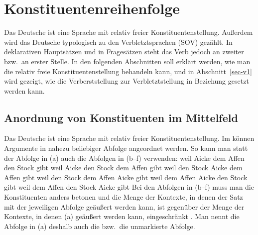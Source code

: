 
\chapter{Konstituentenreihenfolge}
\label{Kapitel-Konstituentenreihenfolge}

Das Deutsche ist eine Sprache mit relativ freier Konstituentenstellung.
Außerdem wird das Deutsche typologisch zu den Verbletztsprachen (SOV) gezählt.
In deklarativen Hauptsätzen und in Fragesätzen steht das Verb jedoch an zweiter
bzw.\ an erster Stelle. In den folgenden Abschnitten soll erklärt werden, wie man
die relativ freie Konstituentenstellung behandeln kann, und in Abschnitt~\ref{sec-v1}
wird gezeigt, wie die Verberststellung zur Verbletztstellung in Beziehung gesetzt werden
kann.

\section{Anordnung von Konstituenten im Mittelfeld}
\label{sec-mf}

Das Deutsche ist eine Sprache mit relativ freier Konstituentenstellung.
Im \mf können Argumente in nahezu beliebiger Abfolge angeordnet werden.
So kann man statt der Abfolge in (a) auch die Abfolgen in (b--f)
verwenden:
\eal
\label{bsp-perm-mf}
\ex
\label{ex-weil Aicke dem Affen den Stock gibt}
weil Aicke dem Affen den Stock gibt
\ex\label{ex-weil Aicke den Stock dem Affen gibt}
weil Aicke den Stock dem Affen gibt
\ex weil den Stock Aicke dem Affen gibt
\ex weil den Stock dem Affen Aicke gibt
\ex weil dem Affen Aicke den Stock gibt
\ex weil dem Affen den Stock Aicke gibt
\zl
Bei den Abfolgen in (b--f) muss man die Konstituenten anders betonen
und die Menge der Kontexte, in denen der Satz mit der jeweiligen Abfolge
geäußert werden kann, ist gegenüber der Menge der Kontexte, in denen (a)
geäußert werden kann, eingeschränkt \citep{Hoehle82a}. Man nennt die
Abfolge in (a) deshalb auch die  bzw.\ die unmarkierte
Abfolge.

